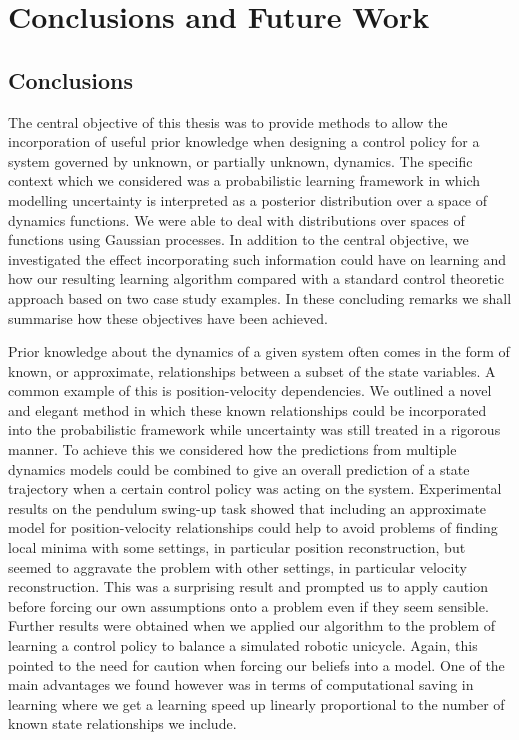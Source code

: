 \chapter{C\lowercase{onclusions and} F\lowercase{uture} W\lowercase{ork}}
\section{Conclusions}
The central objective of this thesis was to provide methods to allow the incorporation of useful prior knowledge when designing a control policy for a system governed by unknown, or partially unknown, dynamics. The specific context which we considered was a probabilistic learning framework in which modelling uncertainty is interpreted as a posterior distribution over a space of dynamics functions. We were able to deal with distributions over spaces of functions using Gaussian processes. In addition to the central objective, we investigated the effect incorporating such information could have on learning and how our resulting learning algorithm compared with a standard control theoretic approach based on two case study examples. In these concluding remarks we shall summarise how these objectives have been achieved.

Prior knowledge about the dynamics of a given system often comes in the form of known, or approximate, relationships between a subset of the state variables. A common example of this is position-velocity dependencies. We outlined a novel and elegant method in which these known relationships could be incorporated into the probabilistic framework while uncertainty was still treated in a rigorous manner. To achieve this we considered how the predictions from multiple dynamics models could be combined to give an overall prediction of a state trajectory when a certain control policy was acting on the system. Experimental results on the pendulum swing-up task showed that including an approximate model for position-velocity relationships could help to avoid problems of finding local minima with some settings, in particular position reconstruction, but seemed to aggravate the problem with other settings, in particular velocity reconstruction. This was a surprising result and prompted us to apply caution before forcing our own assumptions onto a problem even if they seem sensible. Further results were obtained when we applied our algorithm to the problem of learning a control policy to balance a simulated robotic unicycle. Again, this pointed to the need for caution when forcing our beliefs into a model. One of the main advantages we found however was in terms of computational saving in learning where we get a learning speed up linearly proportional to the number of known state relationships we include.


